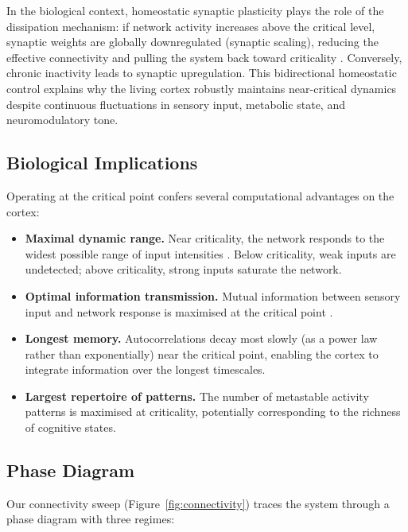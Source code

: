 \documentclass[12pt,a4paper]{article}
\begin{document}
In the biological context, homeostatic synaptic plasticity plays the
role of the dissipation mechanism: if network activity increases above
the critical level, synaptic weights are globally downregulated
(synaptic scaling), reducing the effective connectivity and pulling
the system back toward criticality \cite{turrigiano2004}.  Conversely,
chronic inactivity leads to synaptic upregulation.  This bidirectional
homeostatic control explains why the living cortex robustly maintains
near-critical dynamics despite continuous fluctuations in sensory
input, metabolic state, and neuromodulatory tone.

\subsection{Biological Implications}

Operating at the critical point confers several computational
advantages on the cortex:

\begin{itemize}
  \item \textbf{Maximal dynamic range.}  Near criticality, the network
        responds to the widest possible range of input intensities
        \cite{kinouchi2006}.  Below criticality, weak inputs are
        undetected; above criticality, strong inputs saturate the
        network.

  \item \textbf{Optimal information transmission.}  Mutual information
        between sensory input and network response is maximised at
        the critical point \cite{shew2011}.

  \item \textbf{Longest memory.}  Autocorrelations decay most slowly
        (as a power law rather than exponentially) near the critical
        point, enabling the cortex to integrate information over the
        longest timescales.

  \item \textbf{Largest repertoire of patterns.}  The number of
        metastable activity patterns is maximised at criticality,
        potentially corresponding to the richness of cognitive states.
\end{itemize}

\subsection{Phase Diagram}

Our connectivity sweep (Figure~\ref{fig:connectivity}) traces the
system through a phase diagram with three regimes:
\end{document}
